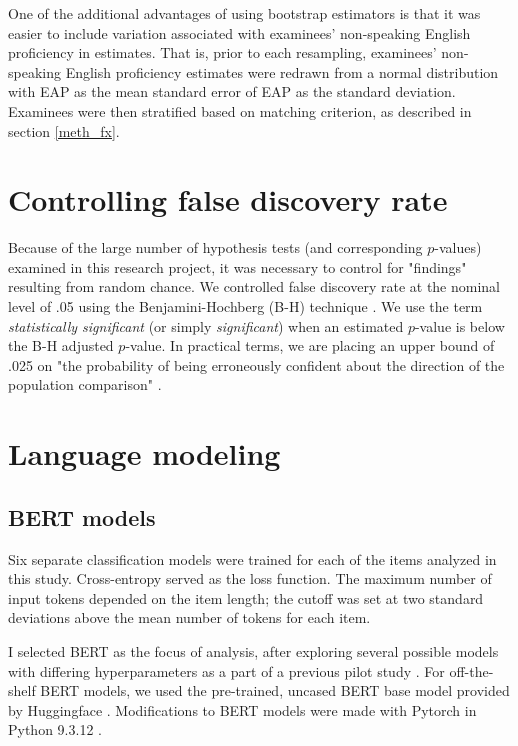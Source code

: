 \documentclass [PhD] {uclathes}
\begin{document}
One of the additional advantages of using bootstrap estimators is that it was easier to include variation associated with examinees’ non-speaking English proficiency in estimates. That is, prior to each resampling, examinees’ non-speaking English proficiency estimates were redrawn from a normal distribution with EAP as the mean standard error of EAP as the standard deviation. Examinees were then stratified based on matching criterion, as described in section \ref{meth_fx}. 

\section{Controlling false discovery rate}
\label{meth_bh}

Because of the large number of hypothesis tests (and corresponding $p$-values) examined in this research project, it was necessary to control for "findings" resulting from random chance. We controlled false discovery rate at the nominal level of .05 using the Benjamini-Hochberg (B-H) technique \citep{benjamini1995controlling}. We use the term \emph{statistically significant} (or simply \emph{significant}) when an estimated $p$-value is below the B-H adjusted $p$-value. In practical terms, we are placing an upper bound of .025 on "the probability of being erroneously confident about the direction of the population comparison" \citep[][p. 43]{williams1999controlling}.

\section{Language modeling}
\label{sec:meth_bert}

\subsection{BERT models}

Six separate classification models were trained for each of the items analyzed in this study. Cross-entropy served as the loss function. The maximum number of input tokens depended on the item length; the cutoff was set at two standard deviations above the mean number of tokens for each item. 

I selected BERT as the focus of analysis, after exploring several possible models with differing hyperparameters as a part of a previous pilot study \citep{kwako2022using}. For off-the-shelf BERT models, we used the pre-trained, uncased BERT base model provided by Huggingface \citep{wolf_transformers_2020, devlin2018}. Modifications to BERT models were made with Pytorch \citep{paszke_pytorch_2019} in Python 9.3.12 \citep{python2022}. 
\end{document}
